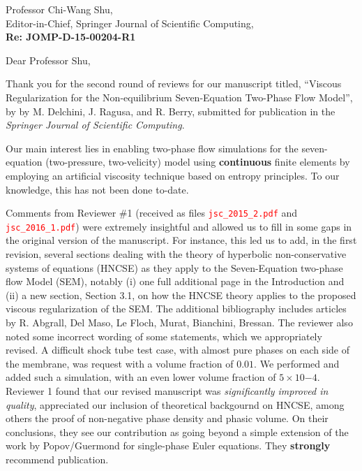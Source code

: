 \documentclass[11pt]{letter}
\newcommand{\tcr}[1]{\textcolor{red}{#1}}
\begin{document}
\begin{letter}{Professor Chi-Wang Shu, \\  Editor-in-Chief, Springer Journal of Scientific Computing,\\
\textbf{Re: JOMP-D-15-00204-R1}}


\date{\today}

\opening{Dear Professor Shu,}
         \vspace{0.25cm}

Thank you for the second round of reviews for our manuscript titled, 
``Viscous Regularization for the Non-equilibrium Seven-Equation Two-Phase Flow Model'', by 
by M. Delchini, J. Ragusa, and R. Berry, submitted for publication in the {\it  Springer Journal of Scientific Computing}. 

Our main interest lies
in enabling two-phase flow simulations for the seven-equation (two-pressure, two-velicity) model using {\bf continuous}
finite elements by employing an artificial viscosity technique based on entropy principles. To our knowledge, this has 
not been done to-date.

Comments from Reviewer \#1 (received as files \tcr{{\tt jsc\_2015\_2.pdf}} and \tcr{{\tt jsc\_2016\_1.pdf}}) 
were extremely insightful and allowed
us to fill in some gaps in the original version of the manuscript. For instance, this led us to add,
in the first revision, several sections
dealing with the theory of hyperbolic non-conservative systems of equations (HNCSE) as they apply to the 
Seven-Equation two-phase flow Model (SEM), notably (i) one full additional page in the Introduction and 
(ii) a new section, Section 3.1, on how the HNCSE theory applies to the proposed viscous regularization of the SEM.
The additional bibliography includes articles by R. Abgrall, Del Maso, Le Floch, Murat, Bianchini, Bressan. 
The reviewer also noted some incorrect wording of some statements, which we appropriately revised. A difficult shock 
tube test case, with almost pure phases on each side of the membrane, was request with a volume fraction of $0.01$. We
performed and added such a simulation, with an even lower volume fraction of $5\times 10{-4}$. 
Reviewer 1 found that our revised manuscript was {\it significantly improved in quality}, appreciated our inclusion of
theoretical backgournd on HNCSE, among others the proof of non-negative phase density and phasic volume.  On their
conclusions, they see our contribution as going beyond a simple extension of the work by Popov/Guermond for single-phase Euler equations. They {\bf strongly} recommend publication.


\end{letter}
\end{document}
